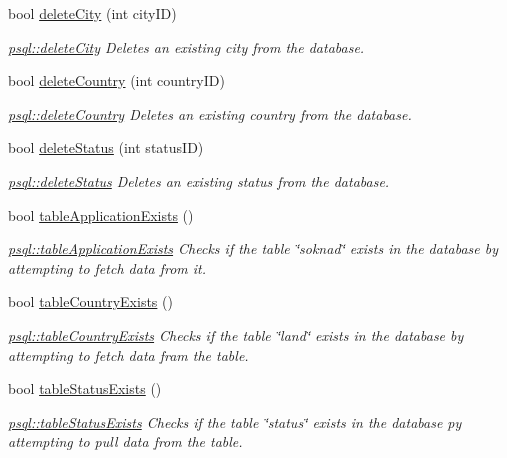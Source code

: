 \begin{DoxyCompactItemize}
bool \hyperlink{classpsql_aaffd42b26b635d9881daaf5fbf4fd62f}{delete\+City} (int city\+ID)
\begin{DoxyCompactList}\small\item\em \hyperlink{classpsql_aaffd42b26b635d9881daaf5fbf4fd62f}{psql\+::delete\+City} Deletes an existing city from the database. \end{DoxyCompactList}\item 
bool \hyperlink{classpsql_a914bf8701fbed4ff80edcd0d09c7c3fd}{delete\+Country} (int country\+ID)
\begin{DoxyCompactList}\small\item\em \hyperlink{classpsql_a914bf8701fbed4ff80edcd0d09c7c3fd}{psql\+::delete\+Country} Deletes an existing country from the database. \end{DoxyCompactList}\item 
bool \hyperlink{classpsql_a26fc592cfb9f484e1bee62af527f2b95}{delete\+Status} (int status\+ID)
\begin{DoxyCompactList}\small\item\em \hyperlink{classpsql_a26fc592cfb9f484e1bee62af527f2b95}{psql\+::delete\+Status} Deletes an existing status from the database. \end{DoxyCompactList}\item 
bool \hyperlink{classpsql_a117b616053845f1b7295b21a06f008fd}{table\+Application\+Exists} ()
\begin{DoxyCompactList}\small\item\em \hyperlink{classpsql_a117b616053845f1b7295b21a06f008fd}{psql\+::table\+Application\+Exists} Checks if the table \char`\"{}soknad\char`\"{} exists in the database by attempting to fetch data from it. \end{DoxyCompactList}\item 
bool \hyperlink{classpsql_ae0ab0012c58471bd3fd63c286fb22224}{table\+Country\+Exists} ()
\begin{DoxyCompactList}\small\item\em \hyperlink{classpsql_ae0ab0012c58471bd3fd63c286fb22224}{psql\+::table\+Country\+Exists} Checks if the table \char`\"{}land\char`\"{} exists in the database by attempting to fetch data fram the table. \end{DoxyCompactList}\item 
bool \hyperlink{classpsql_a3f8bac89bd0cee3af77e47e5c555543d}{table\+Status\+Exists} ()
\begin{DoxyCompactList}\small\item\em \hyperlink{classpsql_a3f8bac89bd0cee3af77e47e5c555543d}{psql\+::table\+Status\+Exists} Checks if the table \char`\"{}status\char`\"{} exists in the database py attempting to pull data from the table. \end{DoxyCompactList}\item 

\end{DoxyCompactItemize}
